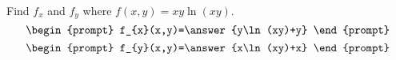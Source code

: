 \documentclass{ximera}
\author{David Guichard \and Neal Koblitz \and H. Jerome Keisler \and Albert Scheller \and Barry Balof \and Mike Wills \and Matthew Carr}
\begin{document}
\begin{exercise}




Find $f_x$ and $f_y$ where $f(x,y)=xy\ln(xy)$.
\[
\begin{prompt}
f_{x}(x,y)=\answer{y\ln(xy)+y}
\end{prompt}
\]
\[
\begin{prompt}
f_{y}(x,y)=\answer{x\ln(xy)+x}
\end{prompt}
\]

\end{exercise}
\end{document}
